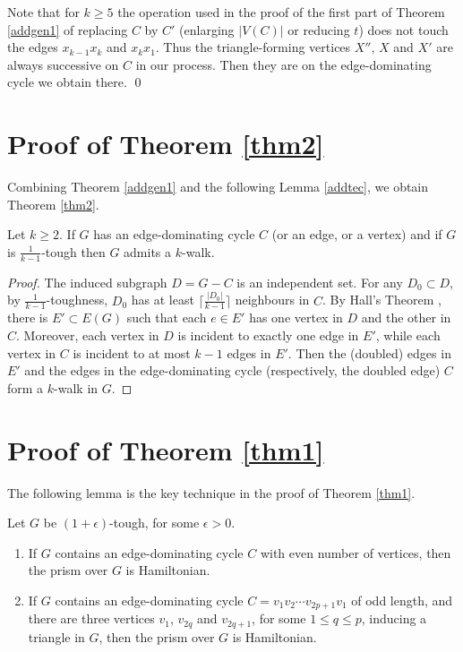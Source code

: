 \documentclass[runningheads,a4paper]{llncs}
\begin{document}
Note that for $k\geq 5$ the operation used 
in the proof of the first part of Theorem \ref{addgen1} 
of replacing  $C$ by $C'$ (enlarging $|V(C)|$ or reducing $t$) 
does not touch the edges $x_{k-1}x_k$ and $x_kx_1$. Thus the triangle-forming 
vertices $X''$, $X$ and $X'$ are always successive on $C$ in our process. 
Then they are on the edge-dominating cycle we obtain there.  \qed


\section{Proof of Theorem \ref{thm2}}


Combining Theorem \ref{addgen1} and the following
Lemma \ref{addtec}, we obtain Theorem \ref{thm2}.

\begin{lemma}\label{addtec}
Let $k\geq 2$.
If $G$ has an edge-dominating cycle $C$ (or an edge, or a vertex) 
and if $G$ is $\frac{1}{k-1}$-tough then $G$ admits a $k$-walk.
\end{lemma}
\begin{proof} 
The induced subgraph $D=G-C$ is an independent set. For any
$D_0\subset D$, by $\frac{1}{k-1}$-toughness, $D_0$ has at least
$\lceil\frac{|D_0|}{k-1}\rceil$ neighbours in $C$. By Hall's Theorem \cite[Theorem 16.4]{bomu08}, 
there is
$E'\subset E(G)$ such that each $e\in E'$ has one vertex in $D$ and the other
in $C$. Moreover, each vertex in $D$ is incident to exactly one edge in $E'$, while
each vertex in $C$ is incident to at most $k-1$ edges in $E'$. Then the
(doubled) edges in $E'$ and the edges in the edge-dominating cycle 
(respectively, the doubled edge) $C$ form a $k$-walk in $G$.  
\end{proof}

%


\section{Proof of Theorem \ref{thm1}}
The following lemma is the key technique in the proof of Theorem \ref{thm1}.
\begin{lemma}\label{keylem}
Let $G$ be $(1+\epsilon)$-tough, for some $\epsilon>0$.
\begin{enumerate}
\item If $G$ contains an edge-dominating cycle $C$ with even number of vertices, then the prism over $G$ is Hamiltonian.
\item If $G$ contains an edge-dominating cycle $C=v_1v_2\cdots v_{2p+1}v_1$ of odd length, and there are three vertices $v_1$, $v_{2q}$ and $v_{2q+1}$, for some $1\le q\le p$, inducing a triangle in $G$, then the prism over $G$ is Hamiltonian.
\end{enumerate}
\end{lemma}
\end{document}
